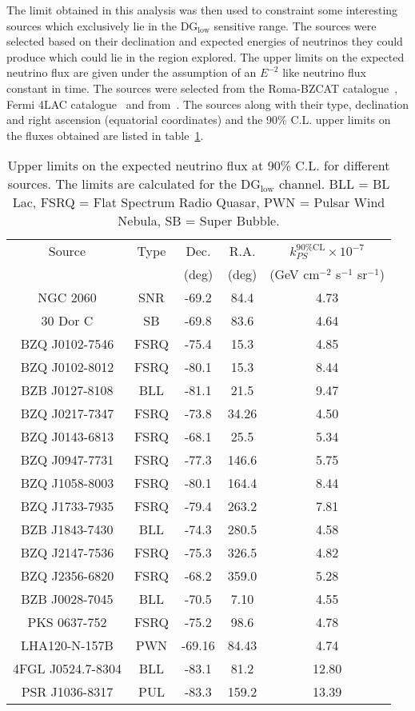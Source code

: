 The limit obtained in this analysis was then used to constraint some interesting sources which exclusively lie in the DG$_{\text{low}}$ sensitive range. The sources were selected based on their declination and expected energies of neutrinos they could produce which could lie in the region explored. The upper limits on the expected neutrino flux are given under the assumption of an $E^{-2}$ like neutrino flux constant in time. The sources were selected from the Roma-BZCAT catalogue~\cite{Massaro:2008ye}, Fermi 4LAC catalogue~\cite{Ballet:2020hze} and from~\cite{Wakely:2007qpa}. The sources along with their type, declination and right ascension (equatorial coordinates) and the 90\% C.L. upper limits on the fluxes obtained are listed in table~\ref{tab:source_limits}. 

\begin{table}
  \centering
  \begin{tabular}{|c|c|c|c|c|}
    \hline
    Source & Type & Dec. & R.A. & $k^{\text{90\%CL}}_{PS} \times 10^{-7}$ \\
    & & (deg) & (deg) & (GeV cm$^{-2}$ s$^{-1}$ sr$^{-1}$) \\
    \hline
    NGC 2060 & SNR & -69.2 & 84.4 & 4.73 \\
    30 Dor C & SB & -69.8 & 83.6 & 4.64 \\
    BZQ J0102-7546 & FSRQ & -75.4 & 15.3 & 4.85 \\
    BZQ J0102-8012 & FSRQ &-80.1 & 15.3 & 8.44  \\
    BZB J0127-8108 & BLL & -81.1 & 21.5 & 9.47 \\
    BZQ J0217-7347 & FSRQ &-73.8 & 34.26 & 4.50 \\
    BZQ J0143-6813 & FSRQ &-68.1 & 25.5 & 5.34 \\
    BZQ J0947-7731 & FSRQ &-77.3 & 146.6 & 5.75 \\
    BZQ J1058-8003 & FSRQ & -80.1 & 164.4 & 8.44 \\
    BZQ J1733-7935 & FSRQ &-79.4 & 263.2 & 7.81 \\
    BZB J1843-7430 & BLL& -74.3 & 280.5 & 4.58 \\
    BZQ J2147-7536 & FSRQ &-75.3 & 326.5 & 4.82 \\
    BZQ J2356-6820 & FSRQ&-68.2 & 359.0 & 5.28 \\
    BZB J0028-7045 & BLL&-70.5 & 7.10 & 4.55 \\
    PKS 0637-752 & FSRQ &-75.2 & 98.6 & 4.78 \\
    LHA120-N-157B & PWN & -69.16 & 84.43 & 4.74 \\
    4FGL J0524.7-8304 & BLL & -83.1 & 81.2 & 12.80 \\
    PSR J1036-8317 & PUL & -83.3 & 159.2 & 13.39 \\
    \hline
  \end{tabular}
  \caption{Upper limits on the expected neutrino flux at 90\% C.L. for different sources. The limits are calculated for the DG$_{\text{low}}$ channel. BLL = BL Lac, FSRQ = Flat Spectrum Radio Quasar, PWN = Pulsar Wind Nebula, SB = Super Bubble.}
  \label{tab:source_limits}
\end{table}
 
